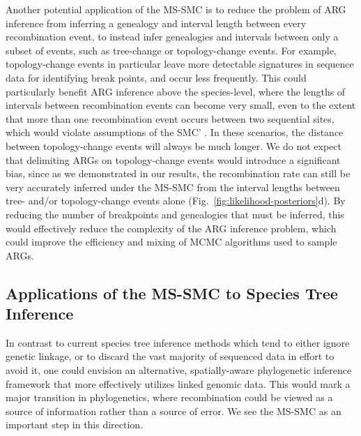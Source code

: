 \documentclass[11pt]{article}
\begin{document}
Another potential application of the MS-SMC is to reduce the problem of 
ARG inference from inferring a genealogy and interval length between 
every recombination event, to instead infer genealogies and intervals between
only a subset of events, such as tree-change or topology-change events. 
% 
For example, topology-change events in particular leave more detectable
signatures in sequence data for identifying break points, and occur less
frequently. This could particularly benefit ARG inference above the
species-level, where the lengths of intervals between recombination events
can become very small, even to the extent that more than one 
recombination event occurs between two sequential sites, which 
would violate assumptions of the SMC' \citep{rasmussen2014genome}. 
In these scenarios, the distance between topology-change events 
will always be much longer.
% 
We do not expect that delimiting ARGs on topology-change events 
would introduce a significant bias, since as we demonstrated in 
our results, the recombination rate can still be very accurately 
inferred under the MS-SMC from the interval lengths between tree- 
and/or topology-change events alone 
(Fig.~\ref{fig:likelihood-posteriors}d). 
% 
By reducing the number of breakpoints and genealogies that must be inferred,
this would effectively reduce the complexity of the ARG inference problem, 
which could improve the efficiency and mixing of MCMC algorithms used to 
sample ARGs.


\subsection{Applications of the MS-SMC to Species Tree Inference}

In contrast to current species tree inference methods 
which tend to either ignore genetic linkage, or to discard the vast majority
of sequenced data in effort to avoid it, one could envision an alternative, 
spatially-aware phylogenetic inference framework that more effectively 
utilizes linked genomic data. This would mark a major transition in phylogenetics,
where recombination could be viewed as a source of information rather than a 
source of error. 
We see the MS-SMC as an important step in this direction. 
\end{document}
